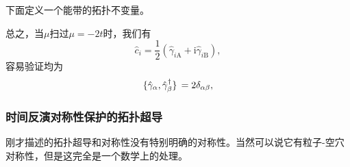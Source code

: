 \documentclass[hyperref, UTF8, a4paper]{ctexart}
\newcommand*{\ii}{\mathrm{i}}
\begin{document}
下面定义一个能带的拓扑不变量。

总之，当$\mu$扫过$\mu=-2t$时，我们有
\[
    \hat{c}_i = \frac{1}{2} (\hat{\gamma}_{i\text{A}} + \ii \hat{\gamma}_{i \text{B}}),
\]
容易验证均为
\begin{equation}
    \acomm*{\hat{\gamma}_\alpha}{\hat{\gamma}_\beta^\dagger} = 2 \delta_{\alpha \beta},
\end{equation}

\subsubsection{时间反演对称性保护的拓扑超导}

刚才描述的拓扑超导和对称性没有特别明确的对称性。当然可以说它有粒子-空穴对称性，但是这完全是一个数学上的处理。
\end{document}
